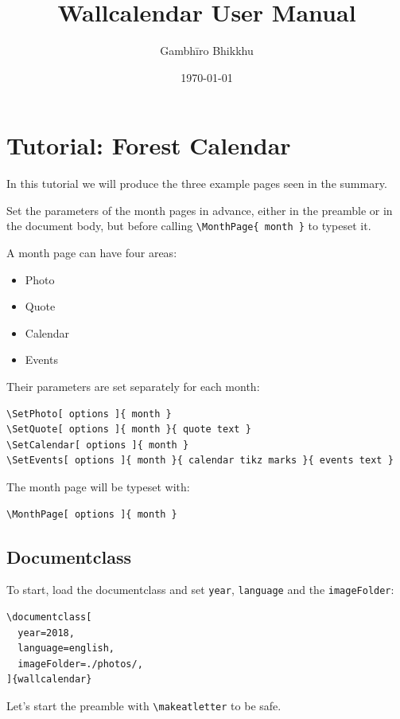 \documentclass[11pt,oneside]{memoir-article}
\author{Gambhīro Bhikkhu}
\date{\today}
\title{Wallcalendar User Manual}
\begin{document}
\maketitle

\chapter{Tutorial: Forest Calendar}
\label{sec:org4441ec9}

In this tutorial we will produce the three example pages seen in the summary.

Set the parameters of the month pages in advance, either in the preamble or in
the document body, but before calling \texttt{\textbackslash{}MonthPage\{ month \}} to typeset it.

A month page can have four areas:

\begin{itemize}
\item Photo
\item Quote
\item Calendar
\item Events
\end{itemize}

Their parameters are set separately for each month:

\begin{verbatim}
\SetPhoto[ options ]{ month }
\SetQuote[ options ]{ month }{ quote text }
\SetCalendar[ options ]{ month }
\SetEvents[ options ]{ month }{ calendar tikz marks }{ events text }
\end{verbatim}


The month page will be typeset with:

\begin{verbatim}
\MonthPage[ options ]{ month }
\end{verbatim}
\section{Documentclass}
\label{sec:org3151d68}

To start, load the documentclass and set \texttt{year}, \texttt{language} and the \texttt{imageFolder}:

\begin{verbatim}
\documentclass[
  year=2018,
  language=english,
  imageFolder=./photos/,
]{wallcalendar}
\end{verbatim}

Let's start the preamble with \texttt{\textbackslash{}makeatletter} to be safe.
\end{document}
